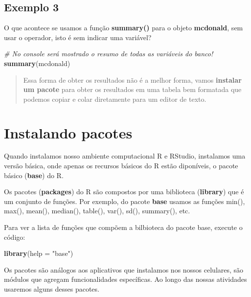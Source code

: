 \documentclass[
]{book}
\newenvironment{Shaded}{\begin{snugshade}}{\end{snugshade}}
\newcommand{\AttributeTok}[1]{\textcolor[rgb]{0.13,0.29,0.53}{#1}}
\newcommand{\CommentTok}[1]{\textcolor[rgb]{0.56,0.35,0.01}{\textit{#1}}}
\newcommand{\FunctionTok}[1]{\textcolor[rgb]{0.13,0.29,0.53}{\textbf{#1}}}
\newcommand{\NormalTok}[1]{#1}
\newcommand{\StringTok}[1]{\textcolor[rgb]{0.31,0.60,0.02}{#1}}
\begin{document}
\section{Exemplo 3}\label{exemplo-3-1}

O que acontece se usamos a função \textbf{summary()} para o objeto \textbf{mcdonald}, sem usar o operador, isto é sem indicar uma variável?

\begin{Shaded}
\begin{Highlighting}[]
\CommentTok{\# No console será mostrado o resumo de todas as variáveis do banco!}
\FunctionTok{summary}\NormalTok{(mcdonald)}
\end{Highlighting}
\end{Shaded}

\begin{quote}
Essa forma de obter os resultados não é a melhor forma, vamos \textbf{instalar um pacote} para obter os resultados em uma tabela bem formatada que podemos copiar e colar diretamente para um editor de texto.
\end{quote}

\chapter{Instalando pacotes}\label{instalando-pacotes}

Quando instalamos nosso ambiente computacional R e RStudio, instalamos uma versão básica, onde apenas os recursos básicos do R estão diponíveis, o pacote básico (\textbf{base}) do R.

Os pacotes (\textbf{packages}) do R são compostos por uma biblioteca (\textbf{library}) que é um conjunto de funções. Por exemplo, do pacote \textbf{base} usamos as funções min(), max(), mean(), median(), table(), var(), sd(), summary(), etc.

Para ver a lista de funções que compõem a bilbioteca do pacote base, execute o código:

\begin{Shaded}
\begin{Highlighting}[]
\FunctionTok{library}\NormalTok{(}\AttributeTok{help =} \StringTok{"base"}\NormalTok{)}
\end{Highlighting}
\end{Shaded}

Os pacotes são análogos aos aplicativos que instalamos nos nossos celulares, são módulos que agregam funcionalidades específicas. Ao longo das nossas atividades usaremos alguns desses pacotes.
\end{document}
